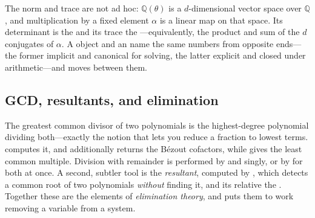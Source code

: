 The norm and trace are not ad hoc: \(\mathbb{Q}(\theta)\) is a \(d\)-dimensional
vector space over \(\mathbb{Q}\), and multiplication by a fixed element \(\alpha\) is
a linear map on that space. Its determinant is the  and its
trace the ---equivalently, the product and sum of the
\(d\) conjugates of \(\alpha\). A  object and an  name the same
numbers from opposite ends---the former implicit and canonical for solving, the latter
explicit and closed under arithmetic---and  moves between them.


\subsection{GCD, resultants, and elimination}
\label{ssec:alg-gcd}

The greatest common divisor of two polynomials is the highest-degree polynomial dividing
both---exactly the notion that lets you reduce a fraction to lowest terms. 
computes it, and  additionally returns the B\'ezout cofactors,
while  gives the least common multiple. Division with remainder is
performed by  and  singly, or by
 for both at once. A second, subtler tool is the
\emph{resultant}, computed by
, which detects a common root of two polynomials \emph{without} finding it,
and its relative the . Together these are the elements of
\emph{elimination theory}, and  puts them to work removing a variable from
a system.


